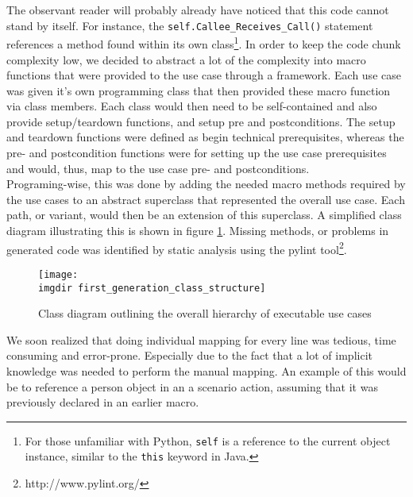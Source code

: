 \noindent
The observant reader will probably already have noticed that this code cannot stand by itself. For instance, the \texttt{self.Callee\_Receives\_Call()} statement references a method found within its own class\footnote{For those unfamiliar with Python, \texttt{self} is a reference to the current object instance, similar to the \texttt{this} keyword in Java.}. In order to keep the code chunk complexity low, we decided to abstract a lot of the complexity into macro functions that were provided to the use case through a framework. Each use case was given it's own programming class that then provided these macro function via class members. Each class would then need to be self-contained and also provide setup/teardown functions, and setup pre and postconditions. The setup and teardown functions were defined as begin technical prerequisites, whereas the pre- and postcondition functions were for setting up the use case prerequisites and would, thus, map to the use case pre- and postconditions.\\

Programing-wise, this was done by adding the needed macro methods required by the use cases to an abstract superclass that represented the overall use case. Each path, or variant, would then be an extension of this superclass. A simplified class diagram illustrating this is shown in figure \ref{fig:first_generation_class_structure}. Missing methods, or problems in generated code was identified by static analysis using the pylint tool\footnote{http://www.pylint.org/}.


\begin{figure}
\centering
\texttt{[image: \\imgdir first\_generation\_class\_structure]}
\caption{Class diagram outlining the overall hierarchy of executable use cases}
\label{fig:first_generation_class_structure}
\end{figure}


We soon realized that doing individual mapping for every line was tedious, time consuming and error-prone. Especially due to the fact that a lot of implicit knowledge was needed to perform the manual mapping. An example of this would be to reference a person object in an a scenario action, assuming that it was previously declared in an earlier macro.